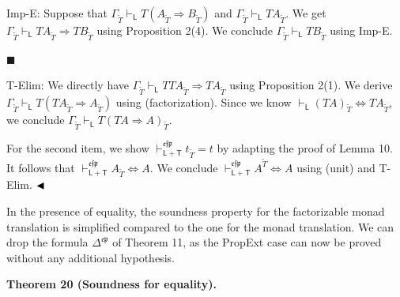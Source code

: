 Imp-E: Suppose that $\Gamma_{\widetilde{T}}\vdash_{\mathsf{L}}T(A_{\widetilde{T}}\mathbin{\Rightarrow}B_{\widetilde{T}})$ and $\Gamma_{\widetilde{T}}\vdash_{\mathsf{L}}TA_{\widetilde{T}}$. We get $\Gamma_{\widetilde{T}}\vdash_{\mathsf{L}}TA_{\widetilde{T}}\mathbin{\Rightarrow}TB_{\widetilde{T}}$ using Proposition 2(4). We conclude $\Gamma_{\widetilde{T}}\vdash_{\mathsf{L}}TB_{\widetilde{T}}$ using Imp-E.\par
 
 
 
\par\noindent  $\blacksquare$ 
 
T-Elim: We directly have $\Gamma_{\widetilde{T}}\vdash_{\mathsf{L}}TTA_{\widetilde{T}}\mathbin{\Rightarrow}TA_{\widetilde{T}}$ using Proposition 2(1). We derive $\Gamma_{\widetilde{T}}\vdash_{\mathsf{L}}T(TA_{\widetilde{T}}\mathbin{\Rightarrow}A_{\widetilde{T}})$ using (factorization). Since we know $\vdash_{\mathsf{L}}(TA)_{\widetilde{T}}\Leftrightarrow TA_{\widetilde{T}}$, we conclude $\Gamma_{\widetilde{T}}\vdash_{\mathsf{L}}T(TA\mathbin{\Rightarrow}A)_{\widetilde{T}}$.\par
 
 
  
For the second item, we show $\vdash_{\mathsf{L}+\mathsf{T}}^{\mathfrak{e}\mathfrak{f}\mathfrak{p}}t_{\widetilde{T}}=t$ by adapting the proof of Lemma 10. It follows that $\vdash_{\mathsf{L}+\mathsf{T}}^{\mathfrak{e}\mathfrak{f}\mathfrak{p}}A_{\widetilde{T}}\Leftrightarrow A$. We conclude $\vdash_{\mathsf{L}+\mathsf{T}}^{\mathfrak{e}\mathfrak{f}\mathfrak{p}}A^{\widetilde{T}}\Leftrightarrow A$ using (unit) and T-Elim. $\hfill\blacktriangleleft$\par
 
 
 
In the presence of equality, the soundness property for the factorizable monad translation is simplified compared to the one for the monad translation. We can drop the formula $\Delta^{\mathfrak{e}\mathfrak{p}}$ of Theorem 11, as the PropExt case can now be proved without any additional hypothesis.\par
 
 
 
\par\medskip\noindent\textbf{Theorem 20 (Soundness for equality).}\par
 
